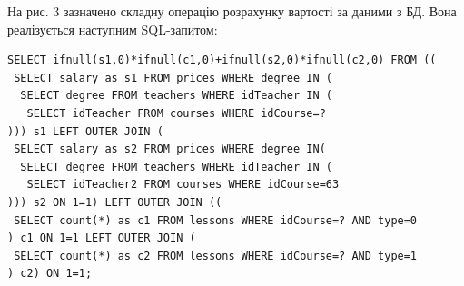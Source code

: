 На рис. 3 зазначено складну операцію розрахунку вартості за даними з БД. Вона реалізується наступним SQL-запитом:
{ \fontsize{10pt}{12pt} \selectfont
\begin{verbatim}
SELECT ifnull(s1,0)*ifnull(c1,0)+ifnull(s2,0)*ifnull(c2,0) FROM ((
 SELECT salary as s1 FROM prices WHERE degree IN (
  SELECT degree FROM teachers WHERE idTeacher IN (
   SELECT idTeacher FROM courses WHERE idCourse=?
))) s1 LEFT OUTER JOIN (
 SELECT salary as s2 FROM prices WHERE degree IN(
  SELECT degree FROM teachers WHERE idTeacher IN (
   SELECT idTeacher2 FROM courses WHERE idCourse=63
))) s2 ON 1=1) LEFT OUTER JOIN ((
 SELECT count(*) as c1 FROM lessons WHERE idCourse=? AND type=0
) c1 ON 1=1 LEFT OUTER JOIN (
 SELECT count(*) as c2 FROM lessons WHERE idCourse=? AND type=1
) c2) ON 1=1;
\end{verbatim}
}


